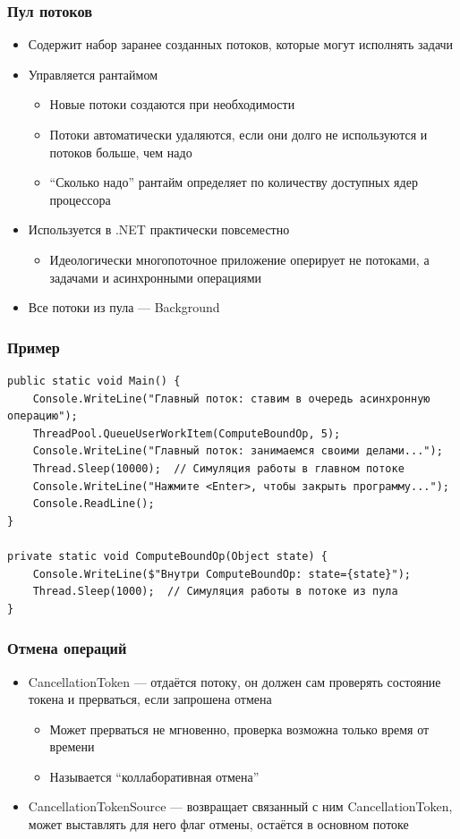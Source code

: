 \documentclass[xetex,mathserif,serif]{beamer}
\begin{document}
	\begin{frame}
		\frametitle{Пул потоков}
		\begin{itemize}
			\item Содержит набор заранее созданных потоков, которые могут исполнять задачи
			\item Управляется рантаймом
			\begin{itemize}
				\item Новые потоки создаются при необходимости
				\item Потоки автоматически удаляются, если они долго не используются и потоков больше, чем надо
				\item ``Сколько надо'' рантайм определяет по количеству доступных ядер процессора
			\end{itemize}
			\item Используется в .NET практически повсеместно
			\begin{itemize}
				\item Идеологически многопоточное приложение оперирует не потоками, а задачами и асинхронными операциями
			\end{itemize}
			\item Все потоки из пула --- Background
		\end{itemize}
	\end{frame}

	\begin{frame}[fragile]
		\frametitle{Пример}
		\begin{verbatim}
public static void Main() {
    Console.WriteLine("Главный поток: ставим в очередь асинхронную операцию");
    ThreadPool.QueueUserWorkItem(ComputeBoundOp, 5);
    Console.WriteLine("Главный поток: занимаемся своими делами...");
    Thread.Sleep(10000);  // Симуляция работы в главном потоке
    Console.WriteLine("Нажмите <Enter>, чтобы закрыть программу...");
    Console.ReadLine();
}

private static void ComputeBoundOp(Object state) {
    Console.WriteLine($"Внутри ComputeBoundOp: state={state}");
    Thread.Sleep(1000);  // Симуляция работы в потоке из пула
}
		\end{verbatim}
	\end{frame}

	\begin{frame}
		\frametitle{Отмена операций}
		\begin{itemize}
			\item CancellationToken --- отдаётся потоку, он должен сам проверять состояние токена и прерваться, если запрошена отмена
			\begin{itemize}
				\item Может прерваться не мгновенно, проверка возможна только время от времени
				\item Называется ``коллаборативная отмена''
			\end{itemize}
			\item CancellationTokenSource --- возвращает связанный с ним CancellationToken, может выставлять для него флаг отмены, остаётся в основном потоке
		\end{itemize}
	\end{frame}
\end{document}
